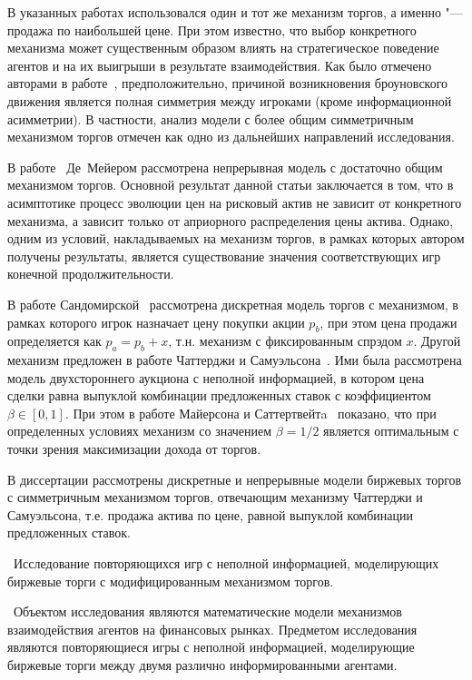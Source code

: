 В указанных работах использовался один и тот же механизм торгов, а именно "--- продажа по наибольшей цене.
При этом известно, что выбор конкретного механизма может существенным образом влиять на стратегическое поведение агентов и на их выигрыши в результате взаимодействия.
Как было отмечено авторами в работе~\cite{demeyer02}, предположительно, причиной возникновения броуновского движения является полная симметрия между игроками (кроме информационной асимметрии).
В частности, анализ модели с более общим симметричным механизмом торгов отмечен как одно из дальнейших направлений исследования.

В работе~\cite{demeyer10} Де~Мейером рассмотрена непрерывная модель с достаточно общим механизмом торгов.
Основной результат данной статьи заключается в том, что в асимптотике процесс эволюции цен на рисковый актив не зависит от конкретного механизма, а зависит только от априорного распределения цены актива.
Однако, одним из условий, накладываемых на механизм торгов, в рамках которых автором получены результаты, является существование значения соответствующих игр конечной продолжительности.

В работе Сандомирской~\cite{sandomirskaya14} рассмотрена дискретная модель торгов с механизмом, в рамках которого игрок назначает цену покупки акции $p_b$, при этом цена продажи определяется как $p_a = p_b + x$, т.н. механизм с фиксированным спрэдом $x$. Другой механизм предложен в работе Чаттерджи и Самуэльсона~\cite{chatterjee83}. Ими была рассмотрена модель двухстороннего аукциона с неполной информацией, в котором цена сделки равна выпуклой комбинации предложенных ставок с коэффициентом $\beta \in [0, 1]$.
При этом в работе Майерсона и Саттертвейтa~\cite{myerson83} показано, что при определенных условиях механизм со значением $\beta = 1/2$ является оптимальным с точки зрения максимизации дохода от торгов.

{\progress} 
В диссертации рассмотрены дискретные и непрерывные модели биржевых торгов с симметричным механизмом торгов, отвечающим механизму Чаттерджи и Самуэльсона, т.е. продажа актива по цене, равной выпуклой комбинации предложенных ставок.

\aim\ Исследование повторяющихся игр с неполной информацией, моделирующих биржевые торги с модифицированным механизмом торгов.

\researchsubject\ Объектом исследования являются математические модели механизмов взаимодействия агентов на финансовых рынках.
Предметом исследования являются повторяющиеся игры с неполной информацией, моделирующие биржевые торги между двумя различно информированными агентами.

